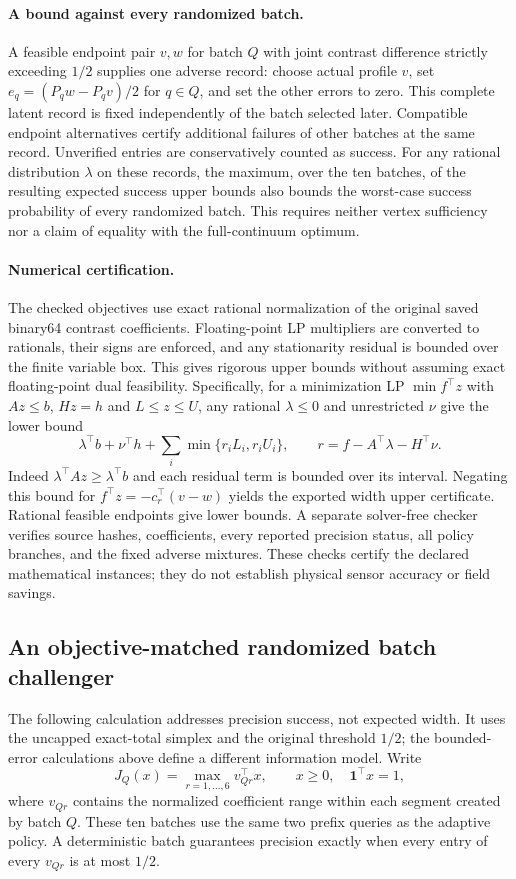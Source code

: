 \paragraph{A bound against every randomized batch.}
A feasible endpoint pair $v,w$ for batch $Q$ with joint contrast difference
strictly exceeding $1/2$ supplies one adverse record: choose actual profile
$v$, set $e_q=(P_qw-P_qv)/2$ for $q\in Q$, and set the other errors to zero.
This complete latent record is fixed independently of the batch selected
later.  Compatible endpoint alternatives certify additional failures of
other batches at the same record.  Unverified entries are conservatively
counted as success.  For any rational distribution $\lambda$ on these
records, the maximum, over the ten batches, of the resulting expected
success upper bounds also bounds the worst-case success probability of
every randomized batch.  This requires neither vertex sufficiency nor a
claim of equality with the full-continuum optimum.

\paragraph{Numerical certification.}
The checked objectives use exact rational normalization of the original
saved binary64 contrast coefficients.  Floating-point LP multipliers are
converted to rationals, their signs are enforced, and any stationarity
residual is bounded over the finite variable box.  This gives rigorous
upper bounds without assuming exact floating-point dual feasibility.
Specifically, for a minimization LP $\min f^\top z$ with $Az\leq b$,
$Hz=h$ and $L\leq z\leq U$, any rational $\lambda\leq0$ and unrestricted
$\nu$ give the lower bound
\[
 \lambda^\top b+\nu^\top h+
 \sum_i\min\{r_iL_i,r_iU_i\},\qquad
 r=f-A^\top\lambda-H^\top\nu.
\]
Indeed $\lambda^\top Az\geq\lambda^\top b$ and each residual term is
bounded over its interval.  Negating this bound for
$f^\top z=-c_r^\top(v-w)$ yields the exported width upper certificate.
Rational feasible endpoints give lower bounds.  A separate solver-free
checker verifies source hashes, coefficients, every reported precision
status, all policy branches, and the fixed adverse mixtures.  These checks
certify the declared mathematical instances; they do not establish physical
sensor accuracy or field savings.
\subsection{An objective-matched randomized batch challenger}
\label{sec:joint-precision-challenger}
The following calculation addresses precision success, not expected width.
It uses the uncapped exact-total simplex and the original threshold $1/2$;
the bounded-error calculations above define a different information model.
Write
\[
 J_Q(x)=\max_{r=1,\ldots,6}v_{Qr}^{\top}x,
 \qquad x\geq0,\quad\boldsymbol1^\top x=1,
\]
where $v_{Qr}$ contains the normalized coefficient range within each segment
created by batch $Q$.  These ten batches use the same two prefix queries as
the adaptive policy.  A deterministic batch guarantees precision exactly
when every entry of every $v_{Qr}$ is at most $1/2$.

